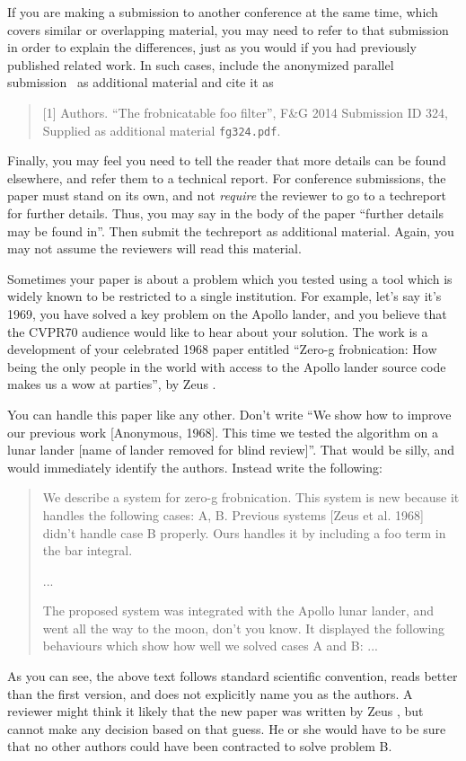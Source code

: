 \documentclass[12pt,letterpaper]{article}
\begin{document}
If you are making a submission to another conference at the same time,
which covers similar or overlapping material, you may need to refer to that
submission in order to explain the differences, just as you would if you
had previously published related work.  In such cases, include the
anonymized parallel submission~ as additional material and
cite it as
\begin{quote}
[1] Authors. ``The frobnicatable foo filter'', F\&G 2014 Submission ID 324,
Supplied as additional material {\tt fg324.pdf}.
\end{quote}

Finally, you may feel you need to tell the reader that more details can be
found elsewhere, and refer them to a technical report.  For conference
submissions, the paper must stand on its own, and not {\em require} the
reviewer to go to a techreport for further details.  Thus, you may say in
the body of the paper ``further details may be found
in''.  Then submit the techreport as additional material.
Again, you may not assume the reviewers will read this material. 

Sometimes your paper is about a problem which you tested using a tool which
is widely known to be restricted to a single institution.  For example,
let's say it's 1969, you have solved a key problem on the Apollo lander,
and you believe that the CVPR70 audience would like to hear about your
solution.  The work is a development of your celebrated 1968 paper entitled
``Zero-g frobnication: How being the only people in the world with access to
the Apollo lander source code makes us a wow at parties'', by Zeus \etal.

You can handle this paper like any other.  Don't write ``We show how to
improve our previous work [Anonymous, 1968].  This time we tested the
algorithm on a lunar lander [name of lander removed for blind review]''.
That would be silly, and would immediately identify the authors. Instead
write the following:
\begin{quotation}
\noindent
   We describe a system for zero-g frobnication.  This
   system is new because it handles the following cases:
   A, B.  Previous systems [Zeus et al. 1968] didn't
   handle case B properly.  Ours handles it by including
   a foo term in the bar integral.

   ...

   The proposed system was integrated with the Apollo
   lunar lander, and went all the way to the moon, don't
   you know.  It displayed the following behaviours
   which show how well we solved cases A and B: ...
\end{quotation}
As you can see, the above text follows standard scientific convention,
reads better than the first version, and does not explicitly name you as
the authors.  A reviewer might think it likely that the new paper was
written by Zeus \etal, but cannot make any decision based on that guess.
He or she would have to be sure that no other authors could have been
contracted to solve problem B.
\end{document}
